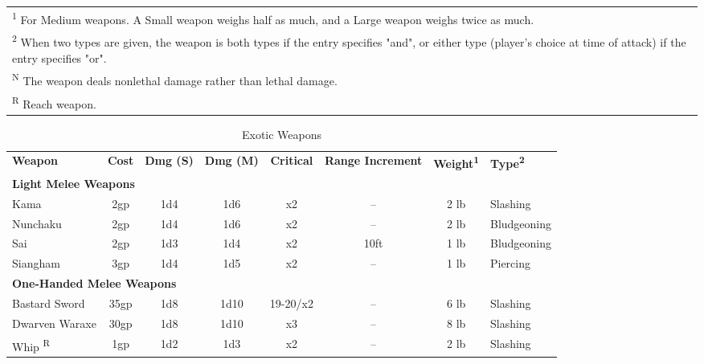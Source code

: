 \begin{table}[htb]
\begin{tabular}{l c c c c c c l}
\multicolumn{8}{p{16cm}}{\textsuperscript{1} For Medium weapons. A Small weapon weighs half as much, and a Large weapon weighs twice as much.}\\
\multicolumn{8}{p{16cm}}{\textsuperscript{2} When two types are given, the weapon is both types if the entry specifies "and", or either type (player's choice at time of attack) if the entry specifies "or".}\\
\multicolumn{8}{p{16cm}}{\textsuperscript{N} The weapon deals nonlethal damage rather than lethal damage.}\\
\multicolumn{8}{p{16cm}}{\textsuperscript{R} Reach weapon.}\\
\end{tabular}
\end{table}

\begin{table}[htb]
\mcinherit
\caption{Exotic Weapons}
\centering
\begin{tabular}{l c c c c c c p{2cm}}
\textbf{Weapon} & \textbf{Cost} & \textbf{Dmg (S)} & \textbf{Dmg (M)} & \textbf{Critical} & \multicolumn{1}{p{1.7cm}}{\textbf{Range\hspace{8pt} Increment}} & \textbf{Weight\textsuperscript{1}} & \textbf{Type\textsuperscript{2}}\\

\multicolumn{8}{l}{\textbf{Light Melee Weapons}}\\
\hspace{.5cm}Kama & 2gp & 1d4 & 1d6 & x2 & -- & 2 lb & Slashing\\
\hspace{.5cm}Nunchaku & 2gp & 1d4 & 1d6 & x2 & -- & 2 lb & Bludgeoning\\
\hspace{.5cm}Sai & 2gp & 1d3 & 1d4 & x2 & 10ft & 1 lb & Bludgeoning\\
\hspace{.5cm}Siangham & 3gp & 1d4 & 1d5 & x2 & -- & 1 lb & Piercing\\

\multicolumn{8}{l}{\textbf{One-Handed Melee Weapons}}\\
\hspace{.5cm}Bastard Sword & 35gp & 1d8 & 1d10 & 19-20/x2 & -- & 6 lb & Slashing\\
\hspace{.5cm}Dwarven Waraxe & 30gp & 1d8 & 1d10 & x3 & -- & 8 lb & Slashing\\
\hspace{.5cm}Whip \textsuperscript{R} & 1gp & 1d2 & 1d3 & x2 & -- & 2 lb & Slashing\\


\end{tabular}
\end{table}
